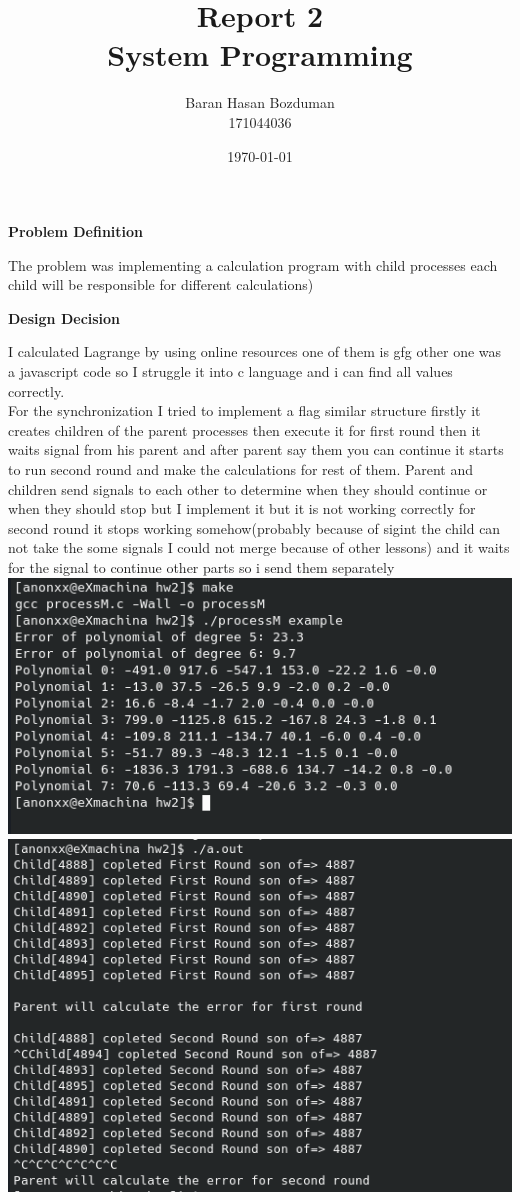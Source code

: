 \documentclass{report}
\title{\huge Report 2 \\ \Huge System Programming}
\author{\huge Baran Hasan Bozduman\\ \huge 171044036}
\date{\today}
\begin{document}
\maketitle
{\huge \textbf{Problem Definition} \\}

{\large The problem was implementing a calculation program with child processes each child will be responsible for different calculations) \\}

{\huge \textbf{Design Decision} \\}

{\large I calculated Lagrange by using online resources one of them is gfg other one was a javascript code so I struggle it into c language and i can find all values correctly.  \\}
{\large For the synchronization I tried to implement a flag similar structure firstly it creates children of the parent processes then execute it for first round then it waits signal from his parent and after parent say them you can continue it starts to run second round and make the calculations for rest of them. Parent and children send signals to each other to determine when they should continue or when they should stop but  I implement it but it is not working correctly for second round it stops working somehow(probably because of sigint the child can not take the some signals I could not merge because of other lessons) and it waits for the signal to continue other parts so i send them separately  \\}
\newline
\includegraphics{images/lag.png}
\newline
\includegraphics{images/sig.png}
\end{document}
